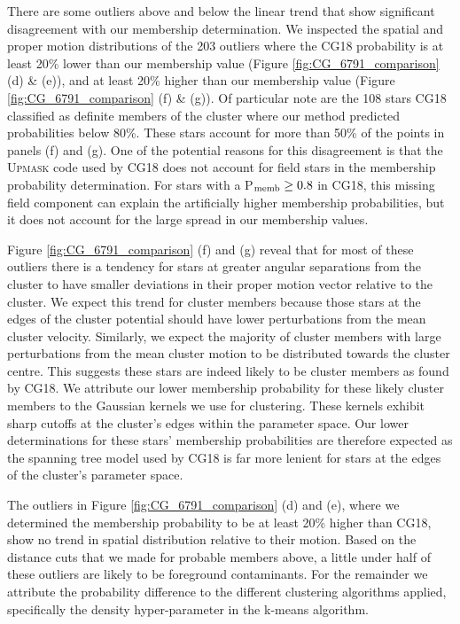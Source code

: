 There are some outliers above and below the linear trend that show significant disagreement with our membership determination. We inspected the spatial and proper motion distributions of the 203 outliers where the CG18 probability is at least 20\% lower than our membership value (Figure \ref{fig:CG_6791_comparison} (d) \& (e)), and at least 20\% higher than our membership value (Figure \ref{fig:CG_6791_comparison} (f) \& (g)). Of particular note are the 108 stars CG18 classified as definite members of the cluster where our method predicted probabilities below 80\%. These stars account for more than 50\% of the points in panels (f) and (g). One of the potential reasons for this disagreement is that the \textsc{Upmask} code used by CG18 does not account for field stars in the membership probability determination. For stars with a P$_{\rm memb} \geq 0.8$ in CG18, this missing field component can explain the artificially higher membership probabilities, but it does not account for the large spread in our membership values.

Figure \ref{fig:CG_6791_comparison} (f) and (g) reveal that for most of these outliers there is a tendency for stars at greater angular separations from the cluster to have smaller deviations in their proper motion vector relative to the cluster. We expect this trend for cluster members because those stars at the edges of the cluster potential should have lower perturbations from the mean cluster velocity. Similarly, we expect the majority of cluster members with large perturbations from the mean cluster motion to be distributed towards the cluster centre. This suggests these stars are indeed likely to be cluster members as found by CG18. We attribute our lower membership probability for these likely cluster members to the Gaussian kernels we use for clustering. These kernels exhibit sharp cutoffs at the cluster's edges within the parameter space. Our lower determinations for these stars' membership probabilities are therefore expected as the spanning tree model used by CG18 is far more lenient for stars at the edges of the cluster's parameter space.

The outliers in Figure \ref{fig:CG_6791_comparison} (d) and (e), where we determined the membership probability to be at least 20\% higher than CG18, show no trend in spatial distribution relative to their motion. Based on the \cite{bailer-jones_estimating_2018} distance cuts that we made for probable members above, a little under half of these outliers are likely to be foreground contaminants. For the remainder we attribute the probability difference to the different clustering algorithms applied, specifically the density hyper-parameter in the k-means algorithm.

